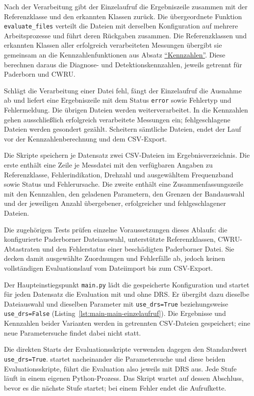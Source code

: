 Nach der Verarbeitung gibt der Einzelaufruf die Ergebniszeile zusammen mit
der Referenzklasse und den erkannten Klassen zurück. Die übergeordnete
Funktion \texttt{evaluate\_\allowbreak files} verteilt die Dateien mit
derselben Konfiguration auf mehrere Arbeitsprozesse und führt deren Rückgaben
zusammen. Die Referenzklassen und erkannten Klassen aller erfolgreich
verarbeiteten Messungen übergibt sie gemeinsam an die Kennzahlenfunktionen aus Absatz
\hyperref[subsec:kennzahlen_impl]{\enquote{Kennzahlen}}. Diese berechnen daraus
die Diagnose- und Detektionskennzahlen, jeweils getrennt für Paderborn und CWRU.

Schlägt die Verarbeitung einer Datei fehl, fängt der Einzelaufruf die
Ausnahme ab und liefert eine Ergebniszeile mit dem Status \texttt{error}
sowie Fehlertyp und Fehlermeldung. Die übrigen Dateien werden weiterverarbeitet.
In die Kennzahlen gehen ausschließlich erfolgreich verarbeitete Messungen ein;
fehlgeschlagene Dateien werden gesondert gezählt. Scheitern sämtliche Dateien,
endet der Lauf vor der Kennzahlenberechnung und dem CSV-Export.

Die Skripte speichern je Datensatz zwei CSV-Dateien im Ergebnisverzeichnis.
Die erste enthält eine Zeile je Messdatei mit den verfügbaren Angaben zu
Referenzklasse, Fehlerindikation, Drehzahl und ausgewähltem Frequenzband sowie
Status und Fehlerursache. Die zweite enthält eine Zusammenfassungszeile mit
den Kennzahlen, den geladenen Parametern, den Grenzen der Bandauswahl und der
jeweiligen Anzahl übergebener, erfolgreicher und fehlgeschlagener Dateien.

Die zugehörigen Tests prüfen einzelne Voraussetzungen dieses Ablaufs:
die konfigurierte Paderborner Dateiauswahl, unterstützte Referenzklassen,
CWRU-Abtastraten und den Fehlerstatus einer beschädigten Paderborner Datei.
Sie decken damit ausgewählte Zuordnungen und Fehlerfälle ab, jedoch keinen
vollständigen Evaluationslauf vom Dateiimport bis zum CSV-Export.

Der Haupteinstiegspunkt \texttt{main.py} lädt die gespeicherte Konfiguration
und startet für jeden Datensatz die Evaluation mit und ohne DRS. Er übergibt
dazu dieselbe Dateiauswahl und dieselben Parameter mit
\texttt{use\_drs=True} beziehungsweise \texttt{use\_drs=False}
(Listing~\ref{lst:main-main-einzelaufruf}). Die Ergebnisse und Kennzahlen
beider Varianten werden in getrennten CSV-Dateien gespeichert; eine neue
Parametersuche findet dabei nicht statt.

Die direkten Starts der Evaluationsskripte verwenden dagegen den
Standardwert \texttt{use\_drs=True}.
 startet nacheinander die
Parametersuche und diese beiden Evaluationsskripte, führt die Evaluation
also jeweils mit DRS aus. Jede Stufe läuft in einem eigenen Python-Prozess.
Das Skript wartet auf dessen Abschluss, bevor es die nächste Stufe startet;
bei einem Fehler endet die Aufrufkette.
